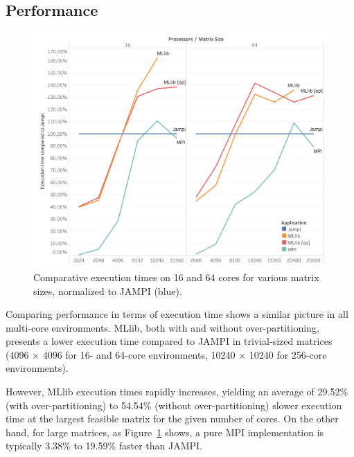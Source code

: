 \documentclass[fleqn,10pt]{SelfArx} %
\begin{document}

\subsection{Performance} %
\label{sub:performance}


\begin{figure}
	\centering
	\includegraphics[width=0.9\linewidth]{compared_to_jampi}
	\vspace{14pt}
	\caption{Comparative execution times on 16 and 64 cores for various matrix sizes, normalized to JAMPI (blue).}
	\label{fig:comparison_to_jampi}
\end{figure}



Comparing performance in terms of execution time shows a similar picture in all multi-core environments. MLlib, both with and without over-partitioning, presents a lower execution time compared to JAMPI in trivial-sized matrices (4096 $\times$ 4096 for 16- and 64-core environments, 10240 $\times$ 10240 for 256-core environments). 

However, MLlib execution times rapidly increases, yielding an average of 29.52\% (with over-partitioning) to 54.54\% (without over-partitioning) slower execution time at the largest feasible matrix for the given number of cores. On the other hand, for large matrices, as Figure~\ref{fig:comparison_to_jampi} shows, a pure MPI implementation is typically 3.38\% to 19.59\% faster than JAMPI. 
\end{document}

